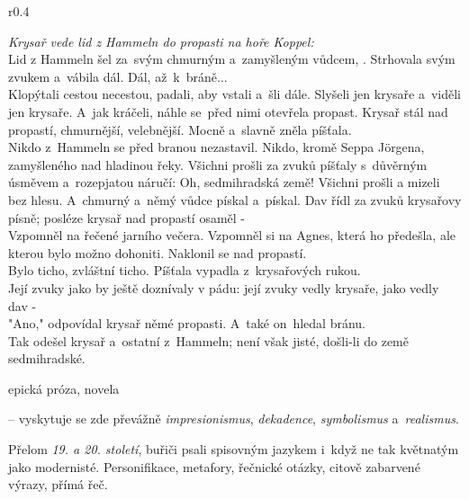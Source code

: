 \documentclass{extarticle} %
\begin{document}
\noindent\begin{wrapfigure}{r}{0.4\textwidth}
\tiny

\setlength{\parindent}{3pt}
\textit{Krysař vede lid z Hammeln do propasti na hoře Koppel:}\\
Lid z Hammeln šel za~svým chmurným a~zamyšleným vůdcem, .
Strhovala svým zvukem a~vábila dál.
Dál, až~k~bráně...\\
Klopýtali cestou necestou, padali, aby vstali a~šli dále.
Slyšeli jen krysaře a~viděli jen krysaře.
A~jak kráčeli, náhle se~před nimi otevřela propast.
Krysař stál nad propastí, chmurnější, velebnější.
Mocně a~slavně zněla píšťala.\\
Nikdo z~Hammeln se před branou nezastavil.
Nikdo, kromě Seppa Jörgena, zamyšleného nad hladinou řeky.
Všichni prošli za zvuků píšťaly s~důvěrným úsměvem a~rozepjatou náručí:
Oh, sedmihradská země!
Všichni prošli a mizeli bez hlesu.
A~chmurný a~němý vůdce pískal a~pískal.
Dav řídl za zvuků krysařovy písně; posléze krysař nad propastí osaměl -\\
Vzpomněl na  řečené jarního večera.
Vzpomněl si na Agnes, která ho předešla, ale kterou bylo možno dohoniti.
Naklonil se nad propastí.\\
Bylo ticho, zvláštní ticho.
Píšťala vypadla z~krysařových rukou.
\\
Její zvuky jako by ještě doznívaly v pádu: její zvuky vedly krysaře, jako vedly dav -\\
"Ano," odpovídal krysař němé propasti.
A~také on~hledal bránu.\\
Tak odešel krysař a~ostatní z~Hammeln; není však jisté, došli-li do země sedmihradské.
\end{wrapfigure}


\noindent epická próza, novela

\noindent{} -- vyskytuje se zde převážně \textit{impresionismus}, \textit{dekadence},
\textit{symbolismus} a~\textit{realismus}.

\noindent Přelom \textit{19. a 20. století}, buřiči psali spisovným jazykem i~když ne tak květnatým jako modernisté.
Personifikace, metafory, řečnické otázky, citově zabarvené výrazy, přímá řeč.

\end{document}
